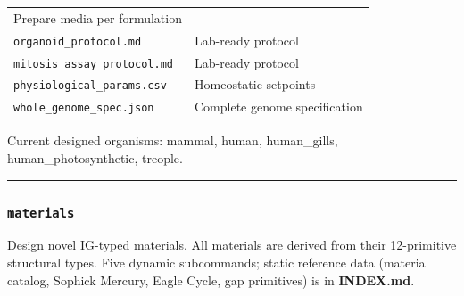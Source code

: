 \documentclass[12pt,a4paper]{article}
\begin{document}
\begin{longtable}[]{@{}ll@{}}
\begin{minipage}[t]{0.54\columnwidth}
Prepare media per formulation\strut
\end{minipage}\tabularnewline
\begin{minipage}[t]{0.40\columnwidth}\raggedright
\texttt{organoid\_protocol.md}\strut
\end{minipage} & \begin{minipage}[t]{0.54\columnwidth}\raggedright
Lab-ready protocol\strut
\end{minipage}\tabularnewline
\begin{minipage}[t]{0.40\columnwidth}\raggedright
\texttt{mitosis\_assay\_protocol.md}\strut
\end{minipage} & \begin{minipage}[t]{0.54\columnwidth}\raggedright
Lab-ready protocol\strut
\end{minipage}\tabularnewline
\begin{minipage}[t]{0.40\columnwidth}\raggedright
\texttt{physiological\_params.csv}\strut
\end{minipage} & \begin{minipage}[t]{0.54\columnwidth}\raggedright
Homeostatic setpoints\strut
\end{minipage}\tabularnewline
\begin{minipage}[t]{0.40\columnwidth}\raggedright
\texttt{whole\_genome\_spec.json}\strut
\end{minipage} & \begin{minipage}[t]{0.54\columnwidth}\raggedright
Complete genome specification\strut
\end{minipage}\tabularnewline
\bottomrule
\end{longtable}

Current designed organisms: mammal, human, human\_gills,
human\_photosynthetic, treople.

\begin{center}\rule{0.5\linewidth}{0.5pt}\end{center}

\hypertarget{materials}{%
\subsubsection{\texorpdfstring{\texttt{materials}}{materials}}\label{materials}}

Design novel IG-typed materials. All materials are derived from their
12-primitive structural types. Five dynamic subcommands; static
reference data (material catalog, Sophick Mercury, Eagle Cycle, gap
primitives) is in \textbf{INDEX.md}.
\end{document}
